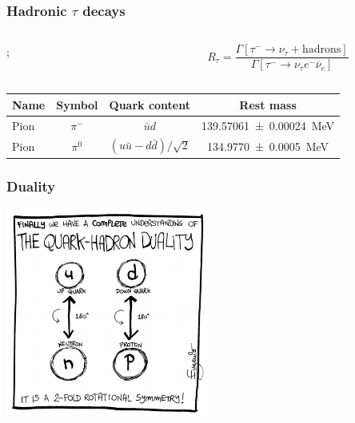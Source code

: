 \documentclass[fleqn]{beamer}
\begin{document}
\begin{frame}
  \frametitle{Hadronic \(\tau\) decays}
  \begin{columns}
    \begin{column}{0.4\textwidth}
      ;
    \end{column}

    \pause
    \begin{column}{0.6\textwidth}
      \begin{equation}
        R_\tau = \frac{\Gamma[\tau^- \to \nu_\tau + \text{hadrons}]}{\Gamma[\tau^- \to \nu_\tau e^- \overline{\nu}_{e}]}
      \end{equation}
    \end{column}
  \end{columns}

  \vspace{1cm}
  
  \pause
  \centering
  \begin{tabular}{lccc}
    \toprule
    Name & Symbol & Quark content & Rest mass \\
    \midrule
    Pion & \(\pi^-\) & \(\bar u d\) & \SI{139.57061 \pm 0.00024}{\mega\eV}  \\
    Pion & \(\pi^0\) & \((u \bar u - d \bar d)/\sqrt{2}\) & \SI{134.9770\pm0.0005}{\mega\eV}
  \end{tabular}
   
\end{frame}
\begin{frame}
  \frametitle{Duality}
  \centering
  \includegraphics[width=0.5\textwidth]{./images/quarkHadronDuality.eps}
\end{frame}
\end{document}
